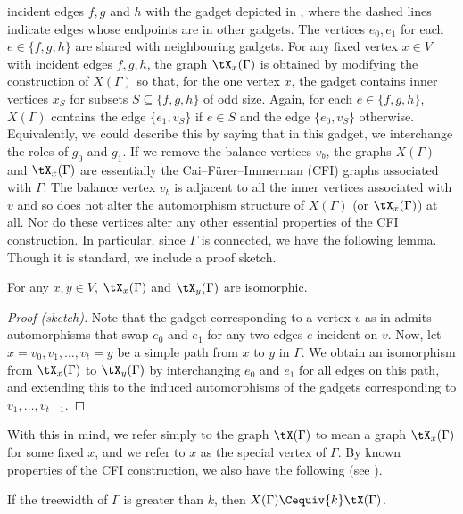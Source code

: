 \documentclass{toc}
\begin{document}
incident edges $f,g$ and $h$ with the gadget depicted in
, where the dashed lines indicate edges whose endpoints
are in other gadgets. The vertices $e_0,e_1$ for each $e \in \{f,g,h\}$ are
shared with neighbouring gadgets.
For any fixed vertex $x \in V$ with incident edges $f,g,h$, the graph $\tX_x(\Gamma)$
is obtained by modifying the construction of $X(\Gamma)$ so that, for the one vertex
$x$, the gadget contains inner vertices $x_S$ for subsets $S \subseteq
\{f,g,h\}$ of odd size. Again, for each $e \in \{f,g,h\}$, $X(\Gamma)$ contains the
edge $\{e_1,v_S\}$ if $e \in S$ and the edge $\{e_0,v_S\}$ otherwise.  Equivalently, we could describe this by saying that in this gadget, we interchange the roles of $g_0$ and $g_1$.
If we remove the balance vertices $v_b$, the graphs $X(\Gamma)$ and $\tX_x(\Gamma)$ are
essentially the Cai--F\"{u}rer--Immerman (CFI) %
%
graphs associated with $\Gamma$. The
balance vertex $v_b$ is adjacent to all the inner vertices associated with $v$
and so does not alter the automorphism structure of $X(\Gamma)$ (or $\tX_x(\Gamma)$) at
all. Nor do these vertices alter any other essential properties of the CFI
construction. In particular, since $\Gamma$ is connected, we have the following
lemma. Though it is standard, we include a proof sketch.
\begin{lemma}\label{lem:v-irrelevant}
  For any $x,y \in V$, $\tX_x(\Gamma)$ and $\tX_y(\Gamma)$ are isomorphic.
\end{lemma}
\begin{proof}[Proof (sketch)]
  Note that the gadget corresponding to a vertex $v$ as in
   admits automorphisms that swap $e_0$ and $e_1$ for any
  two edges $e$ incident on $v$. Now, let $x=v_0,v_1,\ldots,v_t = y$ be a simple
  path from $x$ to $y$ in $\Gamma$. We obtain an isomorphism from $\tX_x(\Gamma)$ to
  $\tX_y(\Gamma)$ by interchanging $e_0$ and $e_1$ for all edges on this path, and
  extending this to the induced automorphisms of the gadgets corresponding to
  $v_1,\ldots,v_{t-1}$.
\end{proof}
With this in mind, we refer simply to the graph $\tX(\Gamma)$ to mean a graph
$\tX_x(\Gamma)$ for some fixed $x$, and we refer to $x$ as the special vertex of $\Gamma$.
By known properties of the CFI construction, we also have the following
(see \cite[Theorem~3]{DR07}).
\begin{lemma}\label{lem:cfi}
  If the treewidth of $\Gamma$ is greater than $k$, then $X(\Gamma) \Cequiv{k} \tX(\Gamma)$.
\end{lemma}
\end{document}
